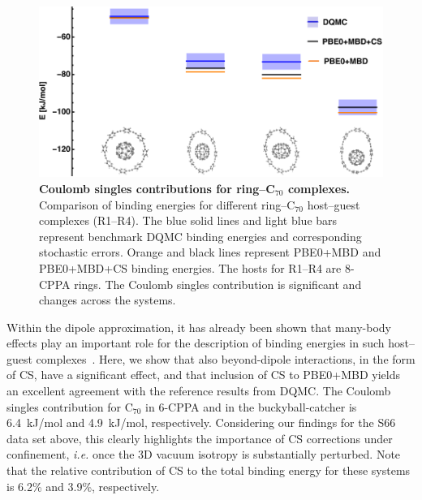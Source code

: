 \documentclass[aps,prl,groupaddress, twocolumn]{revtex4-1}  %
\begin{document}
\begin{figure}[hbtp]
\includegraphics[scale=1.]{Plots/Rings_new.pdf}
\caption{\textbf{Coulomb singles contributions for ring--C$_{70}$ complexes.} Comparison of binding energies for different ring--C$_{70}$ host--guest complexes (R1--R4). The blue solid lines and light blue bars represent benchmark DQMC binding energies and corresponding stochastic errors. Orange and black lines represent PBE0+MBD and PBE0+MBD+CS binding energies. The hosts for R1--R4 are 8-CPPA rings. The Coulomb singles contribution is significant and changes across the systems.}\label{fig:rings}
\end{figure}

Within the dipole approximation, it has already been shown that many-body effects play an important role for the description of binding energies in such host--guest complexes~\cite{hermann_ncomm2017}. Here, we show that also beyond-dipole interactions, in the form of CS, have a significant effect, and that inclusion of CS to PBE0+MBD yields an excellent agreement with the reference results from DQMC\@. The Coulomb singles contribution for C$_{70}$ in 6-CPPA and in the buckyball-catcher is 6.4~kJ/mol and 4.9~kJ/mol, respectively. Considering our findings for the S66 data set above, this clearly highlights the importance of CS corrections under confinement, \textit{i.e.} once the 3D vacuum isotropy is substantially perturbed. Note that the relative contribution of CS to the total binding energy for these systems is 6.2\% and 3.9\%, respectively.
\end{document}
